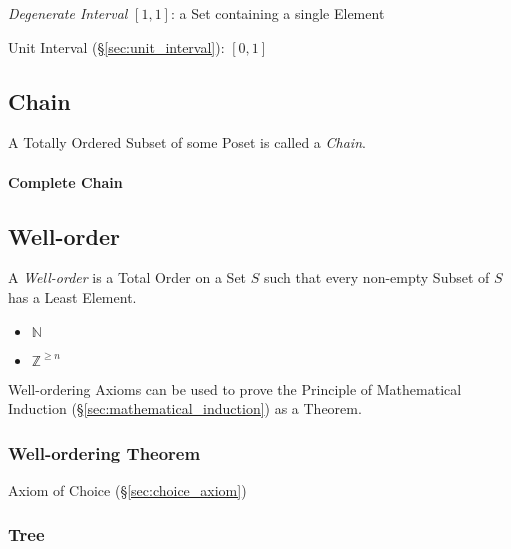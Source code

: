 \emph{Degenerate Interval} $[1,1]$: a Set containing a single Element

Unit Interval (\S\ref{sec:unit_interval}): $[0,1]$



\subsection{Chain}\label{sec:chain}

A Totally Ordered Subset of some Poset is called a \emph{Chain}.

\paragraph{Complete Chain}\label{sec:complete_chain}



\subsection{Well-order}\label{sec:well_order}

A \emph{Well-order} is a Total Order on a Set $S$ such that every
non-empty Subset of $S$ has a Least Element.

\begin{itemize}
  \item $\mathbb{N}$
  \item $\mathbb{Z}^{\geq n}$
\end{itemize}

Well-ordering Axioms can be used to prove the Principle of
Mathematical Induction (\S\ref{sec:mathematical_induction}) as a
Theorem.


\subsubsection{Well-ordering Theorem}\label{sec:wellorder_theorem}

Axiom of Choice (\S\ref{sec:choice_axiom})



\subsubsection{Tree} \label{sec:tree}

